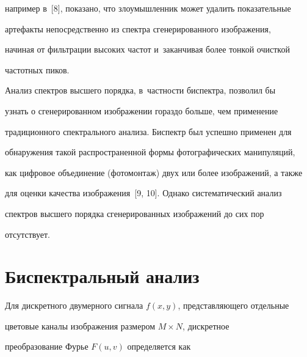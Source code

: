 например в~[8], показано, что злоумышленник может удалить показательные 


артефакты непосредственно из спектра сгенерированного изображения, 


начиная от фильтрации высоких частот и~заканчивая более тонкой очисткой 


частотных пиков.


  


  Анализ спектров высшего порядка, в~частности биспектра, позволил бы 


узнать о сгенерированном изображении гораздо больше, чем применение 


традиционного спектрального анализа. Биспектр был успешно применен для 


обнаружения такой распространенной формы фотографических манипуляций, 


как цифровое объединение (фотомонтаж) двух или более изображений, а также 


для оценки качества изображения~[9, 10]. Однако систематический анализ 


спектров высшего порядка сгенерированных изображений до сих пор 


отсутствует.





\vspace*{-4pt}


  


\section{Биспектральный анализ}





\vspace*{-2pt}





  Для дискретного двумерного сигнала $f(x, y)$, представляющего отдельные 


цветовые каналы изображения размером $M\times N$, дискретное 


преобразование Фурье $F(u,v)$ определяется как





\vspace*{1pt}





